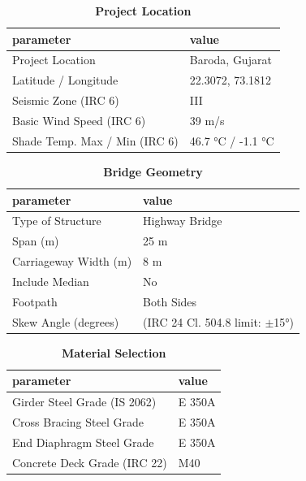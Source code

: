 \documentclass[12pt,a4paper]{report}
\numberwithin{table}{chapter}
\numberwithin{figure}{chapter}
\begin{document}
\begin{table}[H]
\caption{\textbf{Project Location}}
\label{subsec:project-location}
\begin{tabular}{|L{5.5cm}|L{8.5cm}|}
\hline
\textbf{parameter} & \textbf{value} \\
\hline
\textnormal{Project Location} & Baroda, Gujarat \\
\hline
\textnormal{Latitude / Longitude} & 22.3072, 73.1812 \\
\hline
\textnormal{Seismic Zone (IRC 6)} & III \\
\hline
\textnormal{Basic Wind Speed (IRC 6)} & 39 m/s \\
\hline
\textnormal{Shade Temp. Max / Min (IRC 6)} & 46.7 °C / -1.1 °C \\
\hline
\end{tabular}
\vspace{0.4cm}
\end{table}

\begin{table}[H]
\caption{\textbf{Bridge Geometry}}
\label{subsec:bridge-geometry}
\begin{tabular}{|L{5.5cm}|L{8.5cm}|}
\hline
\textbf{parameter} & \textbf{value} \\
\hline
\textnormal{Type of Structure} & Highway Bridge \\
\hline
\textnormal{Span (m)} & 25 m \\
\hline
\textnormal{Carriageway Width (m)} & 8 m \\
\hline
\textnormal{Include Median} & No \\
\hline
\textnormal{Footpath} & Both Sides \\
\hline
\textnormal{Skew Angle (degrees)} &  (IRC 24 Cl. 504.8 limit: $\pm$15°) \\
\hline
\end{tabular}
\end{table}
\vspace{0.4cm}

\begin{table}[H]
\caption{\textbf{Material Selection}}
\label{subsec:material}
\begin{tabular}{|L{5.5cm}|L{8.5cm}|}
\hline
\textbf{parameter} & \textbf{value} \\
\hline
\textnormal{Girder Steel Grade (IS 2062)} & E 350A \\
\hline
\textnormal{Cross Bracing Steel Grade} & E 350A \\
\hline
\textnormal{End Diaphragm Steel Grade} & E 350A \\
\hline
\textnormal{Concrete Deck Grade (IRC 22)} & M40 \\
\hline
\end{tabular}
\end{table}
\vspace{0.4cm}
\end{document}
